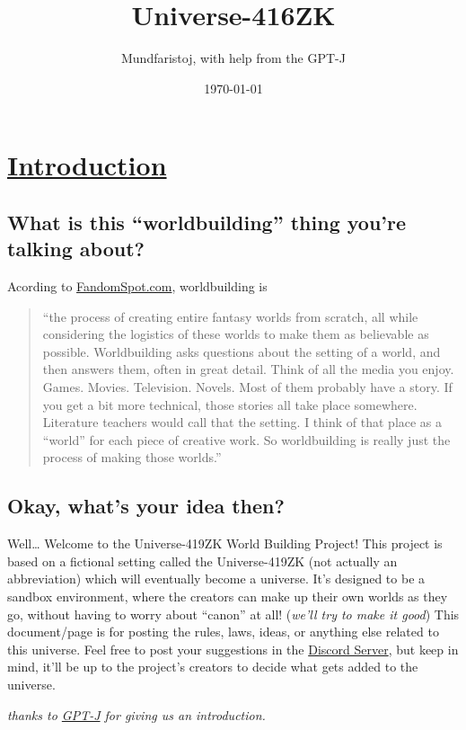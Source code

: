 \documentclass[11pt]{article}
\author{Mundfaristoj, with help from the GPT-J}
\date{\today}
\title{Universe-416ZK}
\begin{document}
\maketitle
\setcounter{tocdepth}{2}
\tableofcontents


\section*{\underline{Introduction}}
\label{sec:orgf38f8d2}
\subsection*{What is this ``worldbuilding'' thing you're talking about?}
\label{sec:orgbaf553c}
Acording to \href{https://www.fandomspot.com/worldbuilding/}{FandomSpot.com}, worldbuilding is
\begin{quote}
``the process of creating entire fantasy worlds from scratch, all while considering the logistics of these worlds to make them as believable as possible. Worldbuilding asks questions about the setting of a world, and then answers them, often in great detail.
Think of all the media you enjoy. Games. Movies. Television. Novels.
Most of them probably have a story.
If you get a bit more technical, those stories all take place somewhere. Literature teachers would call that the setting.
I think of that place as a “world” for each piece of creative work. So worldbuilding is really just the process of making those worlds.''
\end{quote}

\subsection*{Okay, what's your idea then?}
\label{sec:orgf623815}
Well\ldots{}
    Welcome to the Universe-419ZK World Building Project! This project is based on a fictional setting called the Universe-419ZK (not actually an abbreviation) which will eventually become a universe. It's designed to be a sandbox environment, where the creators can make up their own worlds as they go, without having to worry about ``canon'' at all! (\emph{we'll try to make it good}) This document/page is for posting the rules, laws, ideas, or anything else related to this universe. Feel free to post your suggestions in the \href{https://discord.gg/4UKUF78REF}{Discord Server}, but keep in mind, it'll be up to the project's creators to decide what gets added to the universe.

\emph{thanks to \href{https://bellard.org/textsynth/}{GPT-J} for giving us an introduction.}
\end{document}
